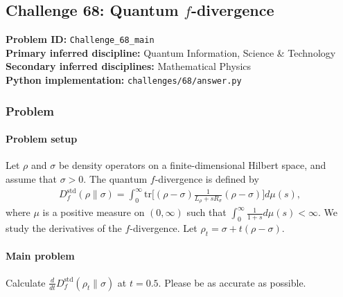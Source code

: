 \subsection[Challenge 68: Quantum f-divergence]{Challenge 68: Quantum $f$-divergence}
\textbf{Problem ID:} \texttt{Challenge\_68\_main}\\
\textbf{Primary inferred discipline:} Quantum Information, Science \& Technology\\
\textbf{Secondary inferred disciplines:} Mathematical Physics\\
\textbf{Python implementation:} \texttt{challenges/68/answer.py}

\subsubsection*{Problem}
\paragraph*{Problem setup}

Let $\rho$ and $\sigma$ be density operators on a finite-dimensional Hilbert space, and assume that $\sigma>0$. The quantum $f$-divergence is defined by 
\begin{align*}
    D^{\mathrm{std}}_f(\rho \|\sigma) =  \int_0^\infty \mathrm{tr}\bigl[ (\rho - \sigma) \frac{1}{L_\rho + s R_\sigma}(\rho-\sigma) \bigr] d\mu(s),
\end{align*}
where $\mu$ is a positive measure on $(0,\infty)$ such that $\int_0^\infty \frac{1}{1+s} d\mu(s) < \infty$. We study the derivatives of the $f$-divergence. Let $\rho_t = \sigma + t(\rho - \sigma)$.

\paragraph*{Main problem}

Calculate $\frac{d}{dt} D^{\mathrm{std}}_f(\rho_t \|\sigma)$ at $t = 0.5$. Please be as accurate as possible.
